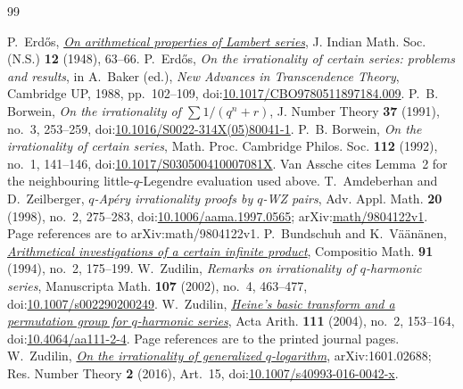 \begin{thebibliography}{99}
\small
\raggedright
\setlength{\itemsep}{2pt}
 P.~Erd\H{o}s,
  \href{https://users.renyi.hu/~p_erdos/1948-04.pdf}{\emph{On arithmetical
  properties of Lambert series}},
  J. Indian Math. Soc. (N.S.) \textbf{12} (1948), 63--66.
 P.~Erd\H{o}s, \emph{On the irrationality of certain series:
  problems and results}, in A.~Baker (ed.), \emph{New Advances in Transcendence
  Theory}, Cambridge UP, 1988, pp.~102--109,
  doi:\href{https://doi.org/10.1017/CBO9780511897184.009}{10.1017/CBO9780511897184.009}.
 P.~B. Borwein, \emph{On the irrationality of
  $\sum1/(q^{n}+r)$},
  J. Number Theory \textbf{37} (1991), no.~3, 253--259,
  doi:\href{https://doi.org/10.1016/S0022-314X(05)80041-1}{10.1016/S0022-314X(05)80041-1}.
 P.~B. Borwein, \emph{On the irrationality of certain
  series}, Math. Proc. Cambridge Philos. Soc. \textbf{112} (1992), no.~1,
  141--146,
  doi:\href{https://doi.org/10.1017/S030500410007081X}{10.1017/S030500410007081X}.
  Van Assche cites Lemma~2 for the neighbouring little-$q$-Legendre
  evaluation used above.
 T.~Amdeberhan and D.~Zeilberger, \emph{$q$-Ap\'ery
  irrationality proofs by $q$-WZ pairs}, Adv. Appl. Math. \textbf{20} (1998),
  no.~2, 275--283,
  doi:\href{https://doi.org/10.1006/aama.1997.0565}{10.1006/aama.1997.0565};
  arXiv:\href{https://arxiv.org/abs/math/9804122v1}{math/9804122v1}.
  Page references are to arXiv:math/9804122v1.
 P.~Bundschuh and K.~V\"a\"an\"anen,
  \href{https://numdam.org/item/CM_1994__91_2_175_0.pdf}{\emph{Arithmetical
  investigations of a certain infinite product}},
  Compositio Math. \textbf{91} (1994), no.~2, 175--199.
 W.~Zudilin, \emph{Remarks on irrationality of
  \(q\)-harmonic series}, Manuscripta Math. \textbf{107} (2002), no.~4,
  463--477,
  doi:\href{https://doi.org/10.1007/s002290200249}{10.1007/s002290200249}.
 W.~Zudilin,
  \href{https://geodesic.mathdoc.fr/articles/10.4064/aa111-2-4/}{\emph{Heine's
  basic transform and a permutation group for \(q\)-harmonic series}},
  Acta Arith. \textbf{111} (2004), no.~2, 153--164,
  doi:\href{https://doi.org/10.4064/aa111-2-4}{10.4064/aa111-2-4}.
  Page references are to the printed journal pages.
 W.~Zudilin,
  \href{https://arxiv.org/abs/1601.02688v2}{\emph{On the irrationality of
  generalized \(q\)-logarithm}}, arXiv:1601.02688; Res. Number Theory
  \textbf{2} (2016), Art.~15,
  doi:\href{https://doi.org/10.1007/s40993-016-0042-x}{10.1007/s40993-016-0042-x}.

\end{thebibliography}
